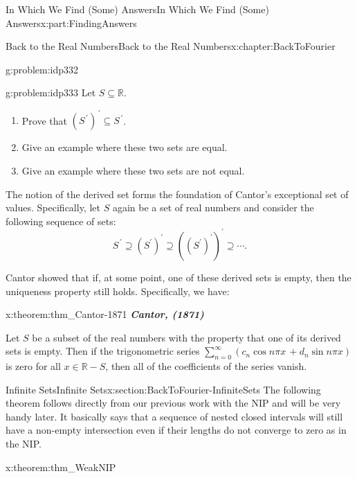 \documentclass[oneside,10pt,]{book}
\newcommand{\alert}[1]{\textbf{\textit{#1}}}
\numberwithin{equation}{section}
\newcommand{\RR}{\mathbb {R}}
\begin{document}
\begin{partptx}{In Which We Find (Some) Answers}{}{In Which We Find (Some) Answers}{}{}{x:part:FindingAnswers}
\begin{chapterptx}{Back to the Real Numbers}{}{Back to the Real Numbers}{}{}{x:chapter:BackToFourier}
\begin{introduction}{}
\begin{problem}{}{g:problem:idp332}
\begin{enumerate}[label=(\alph*)]
\end{enumerate}
%
\end{problem}
\begin{problem}{}{g:problem:idp333}%
 Let \(S\subseteq\RR\).%
\begin{enumerate}[label=(\alph*)]
\item{}Prove that \(\left(S^{\,\prime}\right)^{\,\prime}\subseteq S^{\,\prime}\).%
\item{}Give an example where these two sets are equal.%
\item{}Give an example where these two sets are not equal.%
\end{enumerate}
%
\end{problem}
The notion of the derived set forms the foundation of Cantor's exceptional set of values. Specifically, let \(S\) again be a set of real numbers and consider the following sequence of sets:%
\begin{equation*}
S^{\,\prime}\supseteq \left(S^\prime\right)^\prime\supseteq \left(\left(S^\prime\right)^\prime\right)^\prime\supseteq \cdots\text{.}
\end{equation*}
%
\par
Cantor  showed that if, at some point, one of these derived sets is empty, then the uniqueness property still holds. Specifically, we have:%
\begin{theorem}{}{}{x:theorem:thm_Cantor-1871}%
\alert{Cantor, (1871)}%
\par
{} Let \(S\) be a subset of the real numbers with the property that one of its derived sets is empty.  Then if the trigonometric series \(\sum_{n=0}^\infty\left(c_n\cos n\pi
x\,+d_n\sin n\pi x\right)\) is zero for all \(x\in\RR-S\), then all of the coefficients of the series vanish.%
\end{theorem}
\end{introduction}%
%
%
\typeout{************************************************}
\typeout{************************************************}
%
\begin{sectionptx}{Infinite Sets}{}{Infinite Sets}{}{}{x:section:BackToFourier-InfiniteSets}
The following theorem follows directly from our previous work with the NIP and will be very handy later. It basically says that a sequence of nested closed intervals will still have a non-empty intersection even if their lengths do not converge to zero as in the NIP.%
\begin{theorem}{}{}{x:theorem:thm_WeakNIP}%

\end{theorem}
\end{sectionptx}
\end{chapterptx}
\end{partptx}
\end{document}
